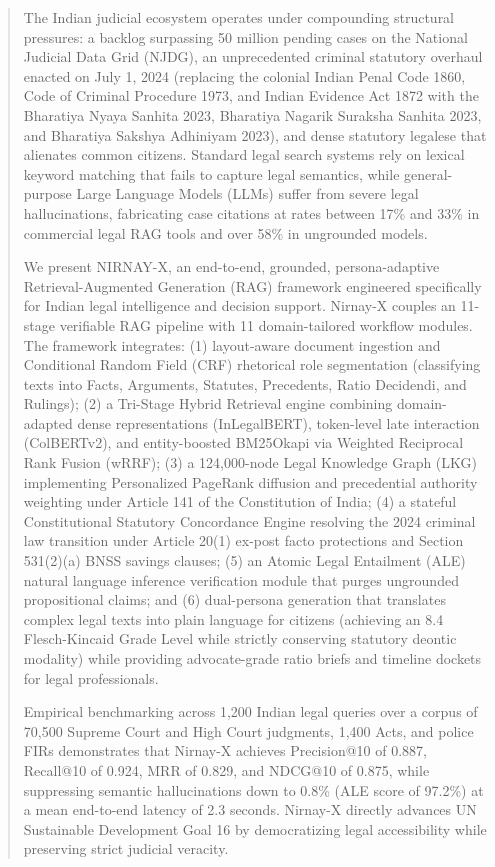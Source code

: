 \documentclass[conference]{IEEEtran}
\begin{document}
\begin{abstract}
The Indian judicial ecosystem operates under compounding structural pressures: a backlog surpassing 50 million pending cases on the National Judicial Data Grid (NJDG), an unprecedented criminal statutory overhaul enacted on July 1, 2024 (replacing the colonial Indian Penal Code 1860, Code of Criminal Procedure 1973, and Indian Evidence Act 1872 with the Bharatiya Nyaya Sanhita 2023, Bharatiya Nagarik Suraksha Sanhita 2023, and Bharatiya Sakshya Adhiniyam 2023), and dense statutory legalese that alienates common citizens. Standard legal search systems rely on lexical keyword matching that fails to capture legal semantics, while general-purpose Large Language Models (LLMs) suffer from severe legal hallucinations, fabricating case citations at rates between 17\% and 33\% in commercial legal RAG tools and over 58\% in ungrounded models. 

We present NIRNAY-X, an end-to-end, grounded, persona-adaptive Retrieval-Augmented Generation (RAG) framework engineered specifically for Indian legal intelligence and decision support. Nirnay-X couples an 11-stage verifiable RAG pipeline with 11 domain-tailored workflow modules. The framework integrates: (1) layout-aware document ingestion and Conditional Random Field (CRF) rhetorical role segmentation (classifying texts into Facts, Arguments, Statutes, Precedents, Ratio Decidendi, and Rulings); (2) a Tri-Stage Hybrid Retrieval engine combining domain-adapted dense representations (InLegalBERT), token-level late interaction (ColBERTv2), and entity-boosted BM25Okapi via Weighted Reciprocal Rank Fusion (wRRF); (3) a 124,000-node Legal Knowledge Graph (LKG) implementing Personalized PageRank diffusion and precedential authority weighting under Article 141 of the Constitution of India; (4) a stateful Constitutional Statutory Concordance Engine resolving the 2024 criminal law transition under Article 20(1) ex-post facto protections and Section 531(2)(a) BNSS savings clauses; (5) an Atomic Legal Entailment (ALE) natural language inference verification module that purges ungrounded propositional claims; and (6) dual-persona generation that translates complex legal texts into plain language for citizens (achieving an 8.4 Flesch-Kincaid Grade Level while strictly conserving statutory deontic modality) while providing advocate-grade ratio briefs and timeline dockets for legal professionals. 

Empirical benchmarking across 1,200 Indian legal queries over a corpus of 70,500 Supreme Court and High Court judgments, 1,400 Acts, and police FIRs demonstrates that Nirnay-X achieves Precision@10 of 0.887, Recall@10 of 0.924, MRR of 0.829, and NDCG@10 of 0.875, while suppressing semantic hallucinations down to 0.8\% (ALE score of 97.2\%) at a mean end-to-end latency of 2.3 seconds. Nirnay-X directly advances UN Sustainable Development Goal 16 by democratizing legal accessibility while preserving strict judicial veracity.
\end{abstract}
\end{document}
